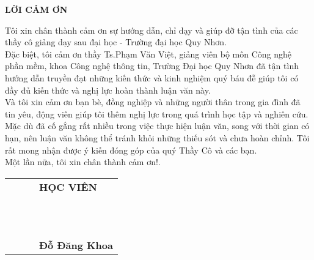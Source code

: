 \newpage
\begin{center}
	\textbf{LỜI CẢM ƠN}
\end{center}
 	
Tôi xin chân thành cảm ơn sự hướng dẫn, chỉ dạy và giúp đỡ tận tình của các thầy cô giảng dạy sau đại học - Trường đại học Quy Nhơn. \\

Đặc biệt, tôi cảm ơn thầy Ts.Phạm Văn Việt, giảng viên bộ môn Công nghệ phần mềm, khoa Công nghệ thông tin, Trường Đại học Quy Nhơn đã tận tình hướng dẫn truyền đạt những kiến thức và kinh nghiệm quý báu đễ giúp tôi có đầy đủ kiến thức và nghị lực hoàn thành luận văn này.\\

Và tôi xin cảm ơn bạn bè, đồng nghiệp và những người thân trong gia đình đã tin yêu, động viên giúp tôi thêm nghị lực trong quá trình học tập và nghiên cứu. \\

Mặc dù đã cố gắng rất nhiều trong việc thực hiện luận văn, song với thời gian có hạn, nên luận văn không thể tránh khỏi những thiếu sót và chưa hoàn chỉnh. Tôi rất mong nhận được ý kiến đóng góp của quý Thầy Cô và các bạn.\\

Một lần nữa, tôi xin chân thành cảm ơn!.


\begin{tabu} to 1.0 \textwidth {  X[c] X[c]  X[c]  X[c]  }

	 & &  & \textbf{HỌC VIÊN} \\
	 \\ \\ \\ \\ \\ \\ \\ \\ \\ \\ \\ 
	 & &  & \textbf{Đỗ Đăng Khoa}  \\

\end{tabu}